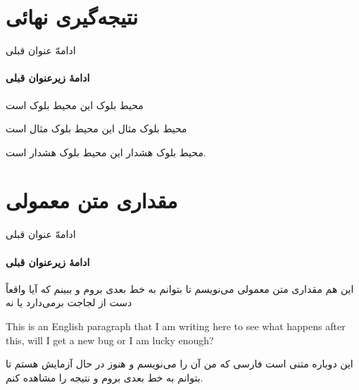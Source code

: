 \documentclass{beamer}
\begin{document}
\section{نتیجه‌گیری نهائی}
\begin{frame}{ادامهّ عنوان قبلی}
\framesubtitle{ادامهٔ زیرعنوان قبلی}
\begin{بلوک}{محیط بلوک}
این محیط بلوک است
\end{بلوک}
\begin{بلوک‌مثال}{محیط بلوک مثال}
این محیط بلوک مثال است
\end{بلوک‌مثال}
\begin{بلوک‌هشدار}{محیط بلوک هشدار}
این محیط بلوک هشدار است.
\end{بلوک‌هشدار}
\end{frame}
\section{مقداری متن معمولی}
\begin{frame}{ادامهّ عنوان قبلی}
\framesubtitle{ادامهٔ زیرعنوان قبلی}
این هم مقداری متن معمولی می‌نویسم تا بتوانم به خط بعدی بروم و ببینم که آیا واقعاً  دست از لجاجت برمی‌دارد یا نه
\begin{english}
This is an English paragraph that I am writing here to see what happens after this, will I get a new bug or I am lucky enough?
\end{english}
این دوباره متنی است فارسی که من آن را می‌نویسم و هنوز در حال آزمایش هستم تا بتوانم به خط بعدی بروم و نتیجه را مشاهده کنم.
\end{frame}
\end{document}
